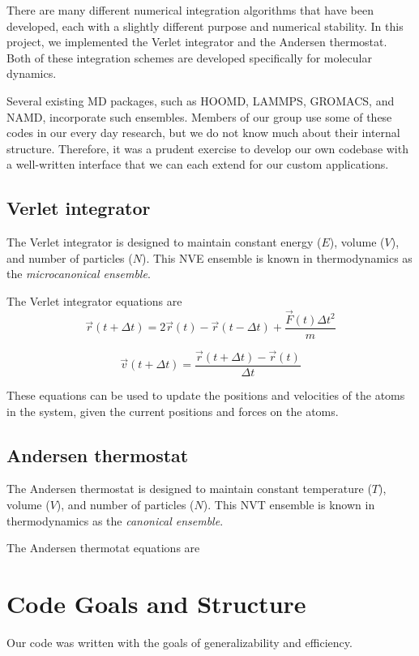 \documentclass[10pt]{article}
\begin{document}
There are many different numerical integration algorithms that have been developed, each with a slightly different purpose and numerical stability.  
%
In this project, we implemented the Verlet integrator and the Andersen thermostat.
%
Both of these integration schemes are developed specifically for molecular dynamics.

Several existing MD packages, such as HOOMD, LAMMPS, GROMACS, and NAMD, incorporate such ensembles. Members of our group use some of these codes in our every day research, but we do not know much about their internal structure. Therefore, it was a prudent exercise to develop our own codebase with a well-written interface that we can each extend for our custom applications.

\subsection{Verlet integrator}
The Verlet integrator is designed to maintain constant energy ($E$), volume ($V$), and number of particles ($N$).  
%
This NVE ensemble is known in thermodynamics as the {\em microcanonical ensemble}.

The Verlet integrator equations are
$$ \overrightarrow{r}(t + \Delta t) = 2 \overrightarrow{r}(t) - \overrightarrow{r}(t- \Delta t) + \frac{\overrightarrow{F}(t) \Delta t ^2}{m}$$

$$ \overrightarrow{v}(t + \Delta t) = \frac{\overrightarrow{r}(t + \Delta t) - \overrightarrow{r}(t)} {\Delta t} $$

These equations can be used to update the positions and velocities of the atoms in the system, given the current positions and forces on the atoms.

\subsection{Andersen thermostat}
The Andersen thermostat is designed to maintain constant temperature ($T$), volume ($V$), and number of particles ($N$).  
%
This NVT ensemble is known in thermodynamics as the {\em canonical ensemble}.

The Andersen thermotat equations are

\section{Code Goals and Structure}
Our code was written with the goals of generalizability and efficiency.
\end{document}
